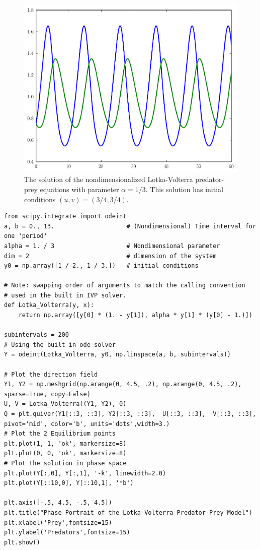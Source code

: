 \begin{figure}
\centering
\includegraphics[width=\textwidth]{Lotka_Volterra.pdf}
\caption{The solution of the nondimensionalized Lotka-Volterra predator-prey equations with parameter $\alpha = 1/3$. 
This solution has initial conditions $(u,v) = (3/4, 3/4)$.}
\label{fig:pred-prey_Lotka_Voterra}
\end{figure}

\begin{lstlisting}
from scipy.integrate import odeint
a, b = 0., 13.                    # (Nondimensional) Time interval for one 'period'
alpha = 1. / 3                    # Nondimensional parameter
dim = 2                           # dimension of the system
y0 = np.array([1 / 2., 1 / 3.])   # initial conditions

# Note: swapping order of arguments to match the calling convention
# used in the built in IVP solver.
def Lotka_Volterra(y, x):
    return np.array([y[0] * (1. - y[1]), alpha * y[1] * (y[0] - 1.)])

subintervals = 200
# Using the built in ode solver
Y = odeint(Lotka_Volterra, y0, np.linspace(a, b, subintervals))

# Plot the direction field
Y1, Y2 = np.meshgrid(np.arange(0, 4.5, .2), np.arange(0, 4.5, .2), sparse=True, copy=False)
U, V = Lotka_Volterra((Y1, Y2), 0)
Q = plt.quiver(Y1[::3, ::3], Y2[::3, ::3],  U[::3, ::3],  V[::3, ::3], pivot='mid', color='b', units='dots',width=3.)
# Plot the 2 Equilibrium points
plt.plot(1, 1, 'ok', markersize=8)
plt.plot(0, 0, 'ok', markersize=8)
# Plot the solution in phase space
plt.plot(Y[:,0], Y[:,1], '-k', linewidth=2.0)
plt.plot(Y[::10,0], Y[::10,1], '*b')

plt.axis([-.5, 4.5, -.5, 4.5])
plt.title("Phase Portrait of the Lotka-Volterra Predator-Prey Model")
plt.xlabel('Prey',fontsize=15)
plt.ylabel('Predators',fontsize=15)
plt.show()
\end{lstlisting}

